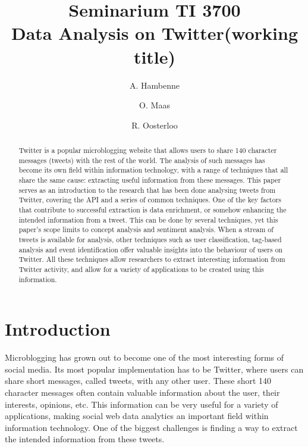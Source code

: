 \documentclass{article}
\title{Seminarium TI 3700\\ Data Analysis on Twitter(working title)}
\author{A. Hambenne  \and
    O. Maas \and
    R. Oosterloo}
\date{}
\begin{document}
\maketitle
\thispagestyle{empty}

\begin{abstract}
Twitter is a popular microblogging website that allows users to share 140 character messages (tweets) with the rest of the world.
The analysis of such messages has become its own field within information technology, with a range of techniques that all share the same cause:
extracting useful information from these messages. This paper serves as an introduction to the research that has been done analysing tweets from Twitter,
covering the API and a series of common techniques. One of the key factors that contribute to successful extraction is data enrichment, or somehow enhancing
the intended information from a tweet. This can be done by several techniques, yet this paper's scope limits to concept analysis and sentiment analysis.
When a stream of tweets is available for analysis, other techniques such as user classification, tag-based analysis and event identification offer valuable
insights into the behaviour of users on Twitter. All these techniques allow researchers to extract interesting information from Twitter activity, and allow
for a variety of applications to be created using this information.
\end{abstract}


\section{Introduction}

Microblogging has grown out to become one of the most interesting forms of social media. Its most popular implementation has to be Twitter, 
where users can share short messages, called tweets, with any other user. These short 140 character messages often contain valuable information about the user, their
interests, opinions, etc. This information can be very useful for a variety of applications, making social web data analytics an important field within
information technology. One of the biggest challenges is finding a way to extract the intended information from these tweets. 
\end{document}
